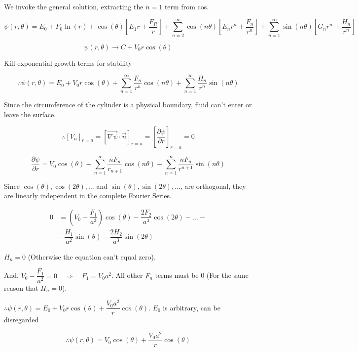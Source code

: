 \documentclass{report}
\begin{document}
We invoke the general solution, extracting the $n=1$ term from cos.

$$
\psi(r, \theta)=E_{0}+F_{0} \ln (r)+\cos (\theta)\left[E_{1} r+\dfrac{F_{R}}{r}\right]+\sum\limits_{n=2}^{\infty} \cos (n \theta)\left[E_{n} r^{n}+\dfrac{F_{n}}{r^{n}}\right]+\sum\limits_{n=1}^{\infty} \sin (n \theta)\left[G_{n} r^{n}+\dfrac{H_{n}}{r^{n}}\right]
$$

$$\psi(r, \theta) \longrightarrow C+V_{0} r \cos (\theta) $$

Kill exponential growth terms for stability

$$
\therefore \psi(r, \theta)=E_{0}+V_0r\cos(\theta)+\sum\limits_{n=1}^{\infty} \dfrac{F_{n}}{r^{n}} \cos (n \theta)+\sum\limits_{n=1}^{\infty} \dfrac{H_{n}}{r^{n}} \sin (n \theta)
$$

Since the circumference of the cylinder is a physical boundary, fluid can't enter or leave the surface.

$$\therefore\left[V_{n}\right]_{r=a}=\left[\overrightarrow{\nabla \psi} \cdot \vec{n}\right]_{r=a}=\left[\dfrac{\partial \psi}{\partial r}\right]_{r=a}=0$$

$$
\dfrac{\partial \psi}{\partial r}=V_{0} \cos (\theta)-\sum\limits_{n=1}^{\infty} \dfrac{n F_{n}}{r_{n+1}} \cos (n \theta)-\sum\limits_{n=1}^{\infty} \dfrac{n F_{n}}{r^{n+1}} \sin (n \theta)
$$

Since $\cos (\theta), \cos (2 \theta), \ldots$ and $\sin (\theta), \sin (2 \theta), \ldots$, are orthogonal, they are linearly independent in the complete Fourier Series.

$$
\begin{aligned}
0 & =\left(V_{0}-\dfrac{F_{1}}{a^{2}}\right) \cos (\theta)-\dfrac{2 F_{2}}{a^{3}} \cos (2 \theta)-\ldots- \\
& -\dfrac{H_{1}}{a^{2}} \sin (\theta)-\dfrac{2 H_{2}}{a^{3}} \sin (2 \theta)
\end{aligned}
$$

$H_{n}=0$ (Otherwise the equation can't equal zero).

And, $V_{0}-\dfrac{F_{1}}{a^{2}}=0\quad \Rightarrow\quad F_{1}=V_{0} a^{2}$. All other $F_{n}$ terms must be 0 (For the same reason that $H_{n}=0$).

$\therefore \psi(r, \theta)=E_{0}+V_{0} r \cos (\theta)+\dfrac{V_{0} a^{2}}{r} \cos (\theta)$. $E_{0}$ is arbitrary, can be disregarded

\[
\boxed{
\therefore \psi(r, \theta)=V_{0} \cos (\theta)+\dfrac{V_{0} a^{2}}{r} \cos (\theta)
}
\]
\end{document}
